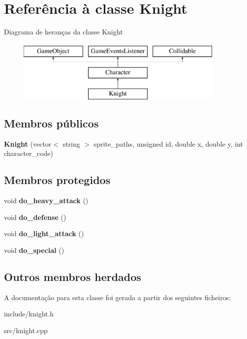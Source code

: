 \hypertarget{classKnight}{}\section{Referência à classe Knight}
\label{classKnight}
Diagrama de heranças da classe Knight\begin{figure}[H]
\begin{center}
\leavevmode
\includegraphics[height=3.000000cm]{classKnight}
\end{center}
\end{figure}
\subsection*{Membros públicos}
\begin{DoxyCompactItemize}
\item 
\mbox{\label{classKnight_af091272d130fbfee62b308e1059e9c5e}} 
{\bfseries Knight} (vector$<$ string $>$ sprite\+\_\+paths, unsigned id, double x, double y, int character\+\_\+code)
\end{DoxyCompactItemize}
\subsection*{Membros protegidos}
\begin{DoxyCompactItemize}
\item 
\mbox{\label{classKnight_a2bd72d822d94d0af391b66f4dce1af19}} 
void {\bfseries do\+\_\+heavy\+\_\+attack} ()
\item 
\mbox{\label{classKnight_a2e9d92f7bd099ab26854cf247915fd0f}} 
void {\bfseries do\+\_\+defense} ()
\item 
\mbox{\label{classKnight_abb516eb9c6d5544a9781ff726d0f1035}} 
void {\bfseries do\+\_\+light\+\_\+attack} ()
\item 
\mbox{\label{classKnight_a0e598393444b27ffe69d0438189279a9}} 
void {\bfseries do\+\_\+special} ()
\end{DoxyCompactItemize}
\subsection*{Outros membros herdados}


A documentação para esta classe foi gerada a partir dos seguintes ficheiros\+:\begin{DoxyCompactItemize}
\item 
include/knight.\+h\item 
src/knight.\+cpp\end{DoxyCompactItemize}

